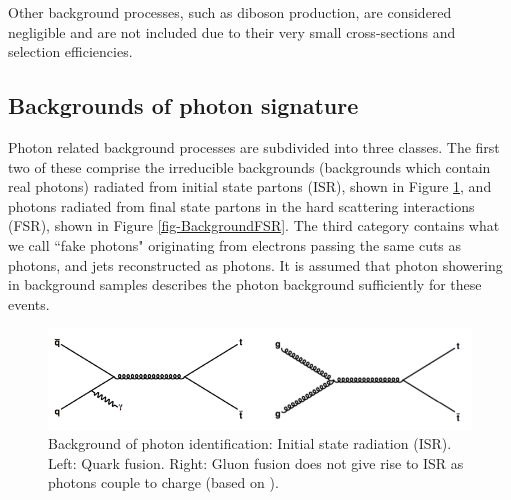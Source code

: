 Other background processes, such as diboson production, are considered negligible and are not included due to their very small cross-sections and selection efficiencies.

\subsection{Backgrounds of photon signature}

Photon related background processes are subdivided into three classes. The first two of these comprise the irreducible backgrounds (backgrounds which contain real photons) radiated from initial state partons (ISR), shown in Figure \ref{fig-BackgroundISR}, and photons radiated from final state partons in the hard scattering interactions (FSR), shown in Figure \ref{fig-BackgroundFSR}. The third category contains what we call ``fake photons" originating from electrons passing the same cuts as photons, and jets reconstructed as photons. It is assumed that photon showering in background samples describes the photon background sufficiently for these events. 


\newpage

\begin{figure} [h!]
\begin{center}
\includegraphics[width=\textwidth]{Figures/BackgroundISR.png}
\end{center}
\caption{Background of photon identification: Initial state radiation (ISR). Left: Quark fusion. Right: Gluon fusion does not give rise to ISR as photons couple to charge (based on \cite{photonbackgrounds}).}
\label{fig-BackgroundISR}
\end{figure}


